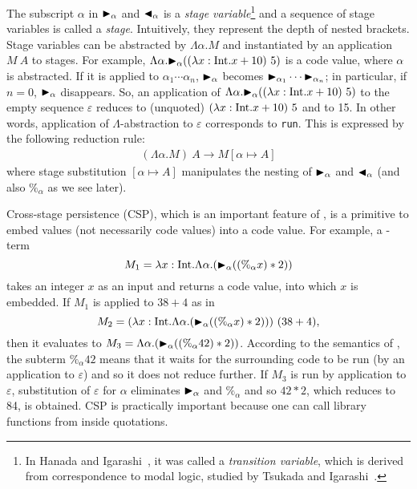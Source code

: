 The subscript $\alpha$ in ${\mathop{\blacktriangleright}}_\alpha$ and ${\mathop{\blacktriangleleft}}_\alpha$ is a \textit{stage
  variable}\footnote{%
  In Hanada and Igarashi~\cite{Hanada2014}, it was called a
  \textit{transition variable}, which is derived from correspondence
  to modal logic, studied by Tsukada and Igarashi~\cite{Tsukada}.} and
a sequence of stage variables is called a \textit{stage}.  Intuitively,
they represent the depth of nested brackets.  Stage variables can be
abstracted by $\Lambda\alpha.M$ and instantiated by an application
$M\ A$ to stages.  For example,
$\Lambda\alpha.{\mathop{\blacktriangleright}}_\alpha ((\lambda x:\textrm{Int}.x+10)\ 5)$ is a code value,
where \(\alpha\) is abstracted.  If it is applied to \(\alpha_1 \cdots \alpha_n\), \({\mathop{\blacktriangleright}}_\alpha\) becomes \({\mathop{\blacktriangleright}}_{\alpha_1} \cdots {\mathop{\blacktriangleright}}_{\alpha_n}\); in particular,
if \(n = 0\), \({\mathop{\blacktriangleright}}_\alpha\) disappears.  So, an
application of $\Lambda\alpha.{\mathop{\blacktriangleright}}_\alpha ((\lambda x:\textrm{Int}.x+10)\ 5)$
to the empty sequence \(\varepsilon\) reduces to
(unquoted) \((\lambda x:\textrm{Int}.x+10)\ 5\) and to 15.  In other words, application of
\(\Lambda\)-abstraction to $\varepsilon$ corresponds to \texttt{run}.
This is expressed by the following reduction rule:
\begin{align*}
	(\Lambda\alpha.M)\ A \longrightarrow M[\alpha\mapsto A]
\end{align*}
where stage substitution \([\alpha \mapsto A]\) manipulates the nesting of
\({\mathop{\blacktriangleright}}_\alpha\) and \({\mathop{\blacktriangleleft}}_\alpha\) (and also \(\%_\alpha\) as we see later).

Cross-stage persistence (CSP), which is an important feature of \LTP,
is a primitive to embed values (not necessarily code values) into a
code value.  For example, a \LTP-term
\[
  M_1 = \lambda x:\textrm{Int}.\Lambda\alpha.({\mathop{\blacktriangleright}}_\alpha ((\%_\alpha x) * 2))
\]
takes an integer \(x\) as an input and returns a code value, into
which \(x\) is embedded.  If $M_1$ is applied to $38 + 4$ as in
\[
  M_2 = (\lambda x:\textrm{Int}.\Lambda\alpha.({\mathop{\blacktriangleright}}_\alpha ((\%_\alpha x) * 2)))\ (38 + 4),
\]
then it evaluates to
\(M_3 = \Lambda\alpha.({\mathop{\blacktriangleright}}_\alpha ((\%_\alpha 42) * 2))\).  According
to the semantics of \LTP, the subterm $\%_\alpha 42$ means that it
waits for the surrounding code to be run (by an application to
$\varepsilon$) and so it does not reduce further.  If \(M_3\) is run
by application to \(\varepsilon\), substitution of \(\varepsilon\) for
\(\alpha\) eliminates \({\mathop{\blacktriangleright}}_\alpha\) and \(\%_\alpha\) and so
\(42 * 2\), which reduces to 84, is obtained.
CSP is practically important because
one can call library functions from inside quotations.  

